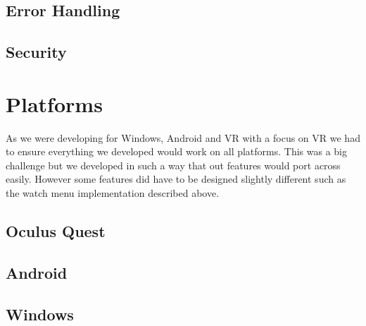 \subsection{Error Handling}

\subsection{Security}

\section{Platforms}
As we were developing for Windows, Android and VR with a focus on VR we had to ensure everything we developed would work on all platforms. This was a big challenge but we developed in such a way that out features would port across easily. However some features did have to be designed slightly different such as the watch menu implementation described above.

\subsection{Oculus Quest}
\subsection{Android}
\subsection{Windows}
